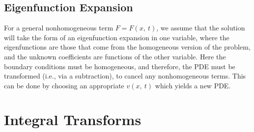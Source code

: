\documentclass{article}
\begin{document}
\subsection{Eigenfunction Expansion}
For a general nonhomogeneous term \(F = F\left( x,\: t \right)\), we
assume that the solution will take the form of an eigenfunction
expansion in one variable, where the eigenfunctions are those that come
from the homogeneous version of the problem, and the unknown
coefficients are functions of the other variable. Here the boundary
conditions must be homogeneous, and therefore, the PDE must be
transformed (i.e., via a subtraction), to cancel any nonhomogeneous
terms. This can be done by choosing an appropriate \(v\left( x,\: t
\right)\) which yields a new PDE.
\section{Integral Transforms}
\end{document}
